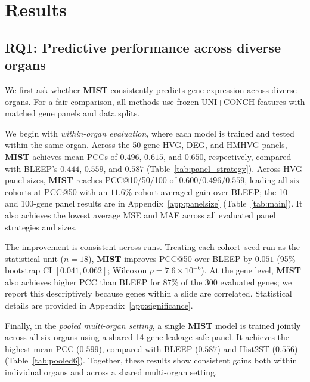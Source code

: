 \documentclass[11pt]{article}
\newcommand{\morph}{\textbf{MIST}}
\begin{document}
\section{Results}
\label{sec:results}

\subsection{RQ1: Predictive performance across diverse organs}
\label{sec:rq1}

We first ask whether \morph{} consistently predicts gene expression across diverse organs. For a fair comparison, all methods use frozen UNI+CONCH features with matched gene panels and data splits.

We begin with \emph{within-organ evaluation}, where each model is trained and tested within the same organ. Across the 50-gene HVG, DEG, and HMHVG panels, \morph{} achieves mean PCCs of $0.496$, $0.615$, and $0.650$, respectively, compared with BLEEP's $0.444$, $0.559$, and $0.587$ (Table~\ref{tab:panel_strategy}). Across HVG panel sizes, \morph{} reaches PCC@10/50/100 of $0.600/0.496/0.559$, leading all six cohorts at PCC@50 with an $11.6\%$ cohort-averaged gain over BLEEP; the 10- and 100-gene panel results are in Appendix~\ref{app:panelsize} (Table~\ref{tab:main}). It also achieves the lowest average MSE and MAE across all evaluated panel strategies and sizes.

The improvement is consistent across runs. Treating each cohort--seed run as the statistical unit ($n{=}18$), \morph{} improves PCC@50 over BLEEP by $0.051$ (95\% bootstrap CI $[0.041,0.062]$; Wilcoxon $p=7.6\times10^{-6}$). At the gene level, \morph{} also achieves higher PCC than BLEEP for $87\%$ of the 300 evaluated genes; we report this descriptively because genes within a slide are correlated. Statistical details are provided in Appendix~\ref{app:significance}.

Finally, in the \emph{pooled multi-organ setting}, a single \morph{} model is trained jointly across all six organs using a shared 14-gene leakage-safe panel. It achieves the highest mean PCC ($0.599$), compared with BLEEP ($0.587$) and Hist2ST ($0.556$) (Table~\ref{tab:pooled6}). Together, these results show consistent gains both within individual organs and across a shared multi-organ setting.
\end{document}
